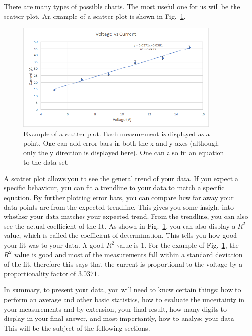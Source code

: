 \documentclass[12pt]{report}
\begin{document}
There are many types of possible charts. The most useful one for us will be the scatter plot. An example of a scatter plot is shown in Fig.~\ref{Fig:Example-Scatter}.
\begin{figure}[h]
\centering
\includegraphics[width=0.9\textwidth]{intro-example-scatter}
\caption{Example of a scatter plot. Each measurement is displayed as a point. One can add error bars in both the x and y axes (although only the y direction is displayed here). One can also fit an equation to the data set.}
\label{Fig:Example-Scatter}
\end{figure}

A scatter plot allows you to see the general trend of your data. If you expect a specific behaviour, you can fit a trendline to your data to match a specific equation. By further plotting error bars, you can compare how far away your data points are from the expected trendline. This gives you some insight into whether your data matches your expected trend. From the trendline, you can also see the actual coefficient of the fit. As shown in Fig.~\ref{Fig:Example-Scatter}, you can also display a $R^2$ value, which is called the coefficient of determination. This tells you how good your fit was to your data. A good $R^2$ value is $1$. For the example of Fig.~\ref{Fig:Example-Scatter}, the $R^2$ value is good and most of the measurements fall within a standard deviation of the fit, therefore this says that the current is proportional to the voltage by a proportionality factor of $3.0371$. 

In summary, to present your data, you will need to know certain things: how to perform an average and other basic statistics, how to evaluate the uncertainty in your measurements and by extension, your final result, how many digits to display in your final answer, and most importantly, how to analyse your data. This will be the subject of the following sections.
\end{document}
